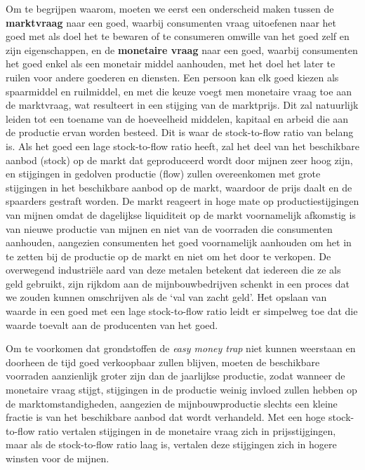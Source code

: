 \documentclass[
  a5paper,
  smalldemyvopaper,11pt,twoside,onecolumn,openright,extrafontsizes,
hidelinks]{memoir}
\begin{document}
Om te begrijpen waarom, moeten we eerst een onderscheid maken tussen de
\textbf{marktvraag} naar een goed, waarbij consumenten vraag uitoefenen
naar het goed met als doel het te bewaren of te consumeren omwille van
het goed zelf en zijn eigenschappen, en de \textbf{monetaire vraag} naar
een goed, waarbij consumenten het goed enkel als een monetair middel
aanhouden, met het doel het later te ruilen voor andere goederen en
diensten. Een persoon kan elk goed kiezen als spaarmiddel en ruilmiddel,
en met die keuze voegt men monetaire vraag toe aan de marktvraag, wat
resulteert in een stijging van de marktprijs. Dit zal natuurlijk leiden
tot een toename van de hoeveelheid middelen, kapitaal en arbeid die aan
de productie ervan worden besteed. Dit is waar de stock-to-flow ratio
van belang is. Als het goed een lage stock-to-flow ratio heeft, zal het
deel van het beschikbare aanbod (stock) op de markt dat geproduceerd
wordt door mijnen zeer hoog zijn, en stijgingen in gedolven productie
(flow) zullen overeenkomen met grote stijgingen in het beschikbare
aanbod op de markt, waardoor de prijs daalt en de spaarders gestraft
worden. De markt reageert in hoge mate op productiestijgingen van mijnen
omdat de dagelijkse liquiditeit op de markt voornamelijk afkomstig is
van nieuwe productie van mijnen en niet van de voorraden die consumenten
aanhouden, aangezien consumenten het goed voornamelijk aanhouden om het
in te zetten bij de productie op de markt en niet om het door te
verkopen. De overwegend industriële aard van deze metalen betekent dat
iedereen die ze als geld gebruikt, zijn rijkdom aan de mijnbouwbedrijven
schenkt in een proces dat we zouden kunnen omschrijven als de `val van
zacht geld'. Het opslaan van waarde in een goed met een lage
stock-to-flow ratio leidt er simpelweg toe dat die waarde toevalt aan de
producenten van het goed.

Om te voorkomen dat grondstoffen de \emph{easy money trap} niet kunnen
weerstaan en doorheen de tijd goed verkoopbaar zullen blijven, moeten de
beschikbare voorraden aanzienlijk groter zijn dan de jaarlijkse
productie, zodat wanneer de monetaire vraag stijgt, stijgingen in de
productie weinig invloed zullen hebben op de marktomstandigheden,
aangezien de mijnbouwproductie slechts een kleine fractie is van het
beschikbare aanbod dat wordt verhandeld. Met een hoge stock-to-flow
ratio vertalen stijgingen in de monetaire vraag zich in prijsstijgingen,
maar als de stock-to-flow ratio laag is, vertalen deze stijgingen zich
in hogere winsten voor de mijnen.
\end{document}
